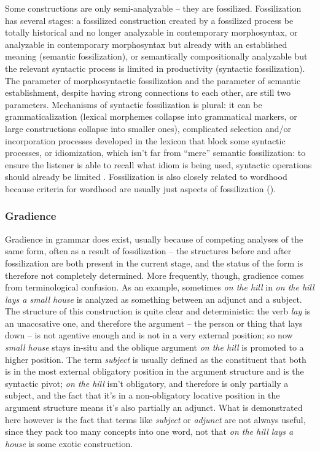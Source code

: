 \documentclass[UTF8, a4paper, oneside, scheme=plain, 12pt]{ctexbook}
\newcommand*{\term}[1]{\emph{#1}}
\newcommand{\form}[1]{\emph{#1}}
\begin{document}
{Some constructions are only semi-analyzable -- 
they are fossilized.
Fossilization has several stages:
a fossilized construction created by a fossilized process 
be totally historical and no longer analyzable in contemporary morphosyntax,
or analyzable in contemporary morphosyntax but already with an established meaning
(semantic fossilization),
or semantically compositionally analyzable 
but the relevant syntactic process is limited in productivity 
(syntactic fossilization).
The parameter of morphosyntactic fossilization 
and the parameter of semantic establishment,
despite having strong connections to each other,
are still two parameters.
Mechanisms of syntactic fossilization is plural: 
it can be grammaticalization 
(lexical morphemes collapse into grammatical markers, 
or large constructions collapse into smaller ones), 
complicated selection and/or incorporation processes developed in the lexicon 
that block some syntactic processes, 
or idiomization, which isn't far from ``mere'' semantic fossilization: 
to ensure the listener is able to recall what idiom is being used, 
syntactic operations should already be limited \citep{nediger2017unifying}.
Fossilization is also closely related to wordhood 
because criteria for wordhood are usually just aspects of fossilization 
().

\subsubsection{Gradience}

Gradience in grammar does exist, 
usually because of competing analyses of the same form, 
often as a result of fossilization -- 
the structures before and after fossilization are both present 
in the current stage, 
and the status of the form is therefore not completely determined. 
More frequently, though, gradience comes from 
terminological confusion.
As an example, sometimes \form{on the hill} in 
\form{on the hill lays a small house}
is analyzed as something between an adjunct and a subject.
The structure of this construction is quite clear and deterministic:
the verb \form{lay} is an unaccsative one, 
and therefore the argument -- the person or thing that lays down -- 
is not agentive enough and is not in a very external position;
so now \form{small house} stays in-situ 
and the oblique argument \form{on the hill} is promoted to a higher position. 
The term \term{subject} is usually defined as 
the constituent that both is in  
the most external obligatory position in the argument structure 
and is the syntactic pivot; 
\form{on the hill} isn't obligatory, 
and therefore is only partially a subject, 
and the fact that it's in a non-obligatory locative position in the argument structure 
means it's also partially an adjunct. 
What is demonstrated here however is the fact that 
terms like \term{subject} or \term{adjunct} 
are not always useful, since they pack too many concepts into one word, 
not that \form{on the hill lays a house} is some exotic construction.

}
\end{document}
